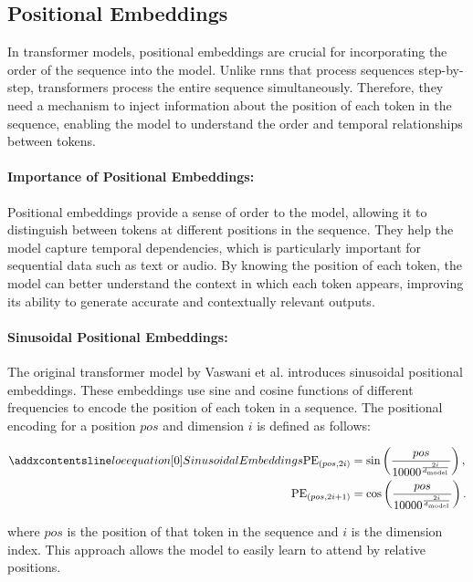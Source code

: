 \subsection{Positional Embeddings}
\label{sec:posenc}
In transformer models, positional embeddings are crucial for incorporating the order of the sequence into the model. Unlike \glspl{rnn} that process sequences step-by-step, transformers process the entire sequence simultaneously. Therefore, they need a mechanism to inject information about the position of each token in the sequence, enabling the model to understand the order and temporal relationships between tokens.

\paragraph {Importance of Positional Embeddings:}

Positional embeddings provide a sense of order to the model, allowing it to distinguish between tokens at different positions in the sequence. They help the model capture temporal dependencies, which is particularly important for sequential data such as text or audio. By knowing the position of each token, the model can better understand the context in which each token appears, improving its ability to generate accurate and contextually relevant outputs.

\paragraph {Sinusoidal Positional Embeddings:}

The original transformer model by Vaswani et al. \cite{transformer} introduces sinusoidal positional embeddings. These embeddings use sine and cosine functions of different frequencies to encode the position of each token in a sequence. The positional encoding for a position $pos$ and dimension $i$ is defined as follows:

\begin{align}
\setequationentry{Sinusoidal Embeddings}
    \text{PE}_{(pos, 2i)} &= \sin\left(\frac{pos}{10000^{\frac{2i}{d_{\text{model}}}}}\right), \\
    \text{PE}_{(pos, 2i+1)} &= \cos\left(\frac{pos}{10000^{\frac{2i}{d_{\text{model}}}}}\right).
\end{align}

where $pos$ is the position of that token in the sequence and $i$ is the dimension index. This approach allows the model to easily learn to attend by relative positions.

